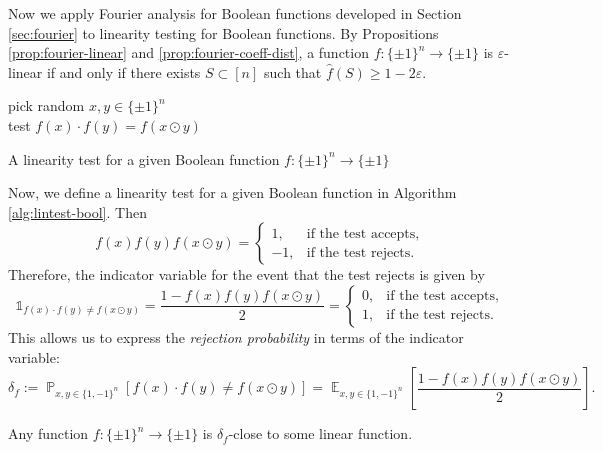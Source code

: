 \documentclass[letterpaper, reqno,11pt]{article}
\newcommand{\PP}{\mathop{{}\mathbb{P}}}
\newcommand{\EE}{\mathop{{}\mathbb{E}}}
\begin{document}
Now we apply Fourier analysis for Boolean functions developed in Section \ref{sec:fourier} to linearity testing for Boolean functions. By Propositions \ref{prop:fourier-linear} and \ref{prop:fourier-coeff-dist}, a function $f : \{ \pm 1 \}^n \to \{ \pm 1 \}$ is $\varepsilon$-linear if and only if there exists $S \subset [n]$ such that $\hat{f}(S) \geq 1 - 2\varepsilon$.

\begin{algorithm}
  pick random $x, y \in \{ \pm 1 \}^n$ \\
  test $f(x) \cdot f(y) = f(x \odot y)$
  \caption{A linearity test for a given Boolean function $f : \{ \pm 1 \}^n \to \{ \pm 1 \}$}
  \label{alg:lintest-bool}
\end{algorithm}

Now, we define a linearity test for a given Boolean function in Algorithm \ref{alg:lintest-bool}. Then
$$ f(x) f(y) f(x \odot y) = \left\{
  \begin{array}{ll}
    1, & \text{if the test accepts}, \\
    -1, & \text{if the test rejects}.
  \end{array}
\right. $$
Therefore, the indicator variable for the event that the test rejects is given by
$$ \mathds 1_{f(x) \cdot f(y) \neq f(x \odot y)} = \frac{1 - f(x) f(y) f(x \odot y)}{2} = \left\{
  \begin{array}{ll}
    0, & \text{if the test accepts}, \\
    1, & \text{if the test rejects}.
  \end{array}
\right. $$
This allows us to express the \emph{rejection probability} in terms of the indicator variable:
\begin{equation} \label{eq:rejection}
  \delta_f := \PP_{x, y \in \{ 1, -1 \}^n}[f(x) \cdot f(y) \neq f(x \odot y)] = \EE_{x, y \in \{ 1, -1 \}^n}\left[\frac{1 - f(x) f(y) f(x \odot y)}{2}\right].
\end{equation}

\begin{theorem}
  Any function $f : \{ \pm 1 \}^n \to \{ \pm 1 \}$ is $\delta_f$-close to some linear function.
\end{theorem}
\end{document}
